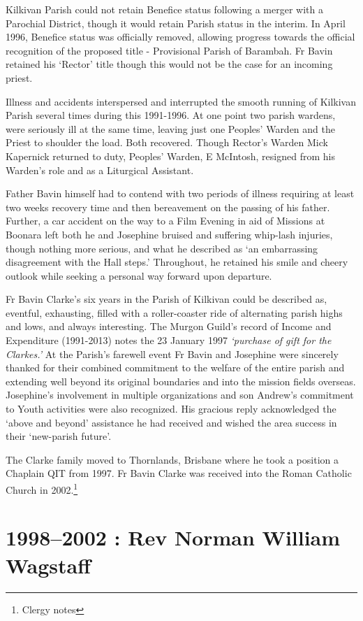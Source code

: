 Kilkivan Parish could not retain Benefice status following a merger with a Parochial District, though it would retain Parish status in the interim. In April 1996, Benefice status was officially removed, allowing progress towards the official recognition of the proposed title - Provisional Parish of Barambah. Fr Bavin retained his `Rector' title though this would not be the case for an incoming priest.

Illness and accidents interspersed and interrupted the smooth running of Kilkivan Parish several times during this 1991-1996. At one point two parish wardens, were seriously ill at the same time, leaving just one Peoples' Warden and the Priest to shoulder the load. Both recovered. Though Rector's Warden Mick Kapernick returned to duty, Peoples' Warden, E McIntosh, resigned from his Warden's role and as a Liturgical Assistant.

Father Bavin himself had to contend with two periods of illness requiring at least two weeks recovery time and then bereavement on the passing of his father. Further, a car accident on the way to a Film Evening in aid of Missions at Boonara left both he and Josephine bruised and suffering whip-lash injuries, though nothing more serious, and what he described as `an embarrassing disagreement with the Hall steps.' Throughout, he retained his smile and cheery outlook while seeking a personal way forward upon departure.

Fr Bavin Clarke's six years in the Parish of Kilkivan could be described as, eventful, exhausting, filled with a roller-coaster ride of alternating parish highs and lows, and always interesting. The Murgon Guild's record of Income and Expenditure (1991-2013) notes the 23 January 1997 \emph{`purchase of gift for the Clarkes.'} At the Parish's farewell event Fr Bavin and Josephine were sincerely thanked for their combined commitment to the welfare of the entire parish and extending well beyond its original boundaries and into the mission fields overseas. Josephine's involvement in multiple organizations and son Andrew's commitment to Youth activities were also recognized. His gracious reply acknowledged the `above and beyond' assistance he had received and wished the area success in their `new-parish future'.

The Clarke family moved to Thornlands, Brisbane where he took a position a Chaplain QIT from 1997. Fr Bavin Clarke was received into the Roman Catholic Church in 2002.\footnote{Clergy notes}

\hypertarget{rev-norman-william-wagstaff}{%
\section{1998--2002 : Rev Norman William Wagstaff}\label{rev-norman-william-wagstaff}}

